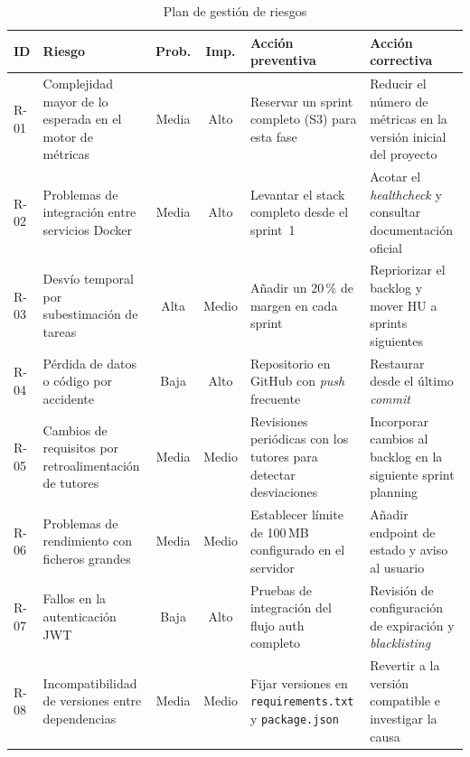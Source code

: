\begin{table}[!t]
  \centering
  \caption{Plan de gestión de riesgos}
  \label{tab:riesgos}
  \small
  \begin{tabularx}{\textwidth}{l >{\raggedright\arraybackslash}X c c >{\raggedright\arraybackslash}X >{\raggedright\arraybackslash}X}
    \toprule
    \textbf{ID} & \textbf{Riesgo} & \textbf{Prob.} & \textbf{Imp.} &
      \textbf{Acción preventiva} & \textbf{Acción correctiva} \\
    \midrule
    R-01 & Complejidad mayor de lo esperada en el motor de métricas
      & Media & Alto
      & Reservar un sprint completo (S3) para esta fase
      & Reducir el número de métricas en la versión inicial del proyecto \\
    R-02 & Problemas de integración entre servicios Docker
      & Media & Alto
      & Levantar el stack completo desde el sprint~1
      & Acotar el \emph{healthcheck} y consultar documentación oficial \\
    R-03 & Desvío temporal por subestimación de tareas
      & Alta  & Medio
      & Añadir un 20\,\% de margen en cada sprint
      & Repriorizar el backlog y mover HU a sprints siguientes \\
    R-04 & Pérdida de datos o código por accidente
      & Baja  & Alto
      & Repositorio en GitHub con \emph{push} frecuente
      & Restaurar desde el último \emph{commit} \\
    R-05 & Cambios de requisitos por retroalimentación de tutores
      & Media & Medio
      & Revisiones periódicas con los tutores para detectar desviaciones
      & Incorporar cambios al backlog en la siguiente sprint planning \\
    R-06 & Problemas de rendimiento con ficheros grandes
      & Media & Medio
      & Establecer límite de 100\,MB configurado en el servidor
      & Añadir endpoint de estado y aviso al usuario \\
    R-07 & Fallos en la autenticación JWT
      & Baja  & Alto
      & Pruebas de integración del flujo auth completo
      & Revisión de configuración de expiración y \emph{blacklisting} \\
    R-08 & Incompatibilidad de versiones entre dependencias
      & Media & Medio
      & Fijar versiones en \texttt{requirements.txt} y \texttt{package.json}
      & Revertir a la versión compatible e investigar la causa \\
    \bottomrule
  \end{tabularx}
\end{table}

